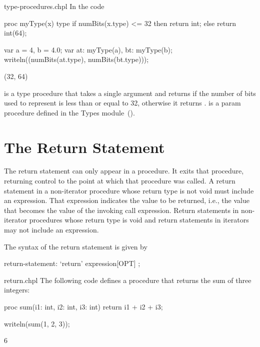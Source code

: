 \begin{chapelexample}{type-procedures.chpl}
In the code
\begin{chapel}
proc myType(x) type {
  if numBits(x.type) <= 32 then return int;
  else return int(64);
}
\end{chapel}
\begin{chapelpost}
var a = 4,
    b = 4.0;
var at: myType(a),
    bt: myType(b);
writeln((numBits(at.type), numBits(bt.type)));
\end{chapelpost}
\begin{chapeloutput}
(32, 64)
\end{chapeloutput}
 is a type procedure that takes a single
argument  and returns  if the number of bits used to
represent  is less than or equal to 32, otherwise it
returns .   is a param
procedure defined in the Types module~().
\end{chapelexample}


\section{The Return Statement}
\label{The_Return_Statement}

The return statement can only appear in a procedure.  It exits that
procedure, returning control to the point at which that procedure was
called.  A return statement in a non-iterator procedure whose
return type is not void must include an expression.
That expression indicates the value to be returned,
i.e., the value that becomes the value of the invoking call expression.
Return statements in non-iterator procedures whose return type is void
and return statements in iterators may not include an expression.

The syntax of the return statement is given by
\begin{syntax}
return-statement:
  `return' expression[OPT] ;
\end{syntax}

\begin{chapelexample}{return.chpl}
The following code defines a procedure that returns the sum of three
integers:
\begin{chapel}
proc sum(i1: int, i2: int, i3: int)
  return i1 + i2 + i3;
\end{chapel}
\begin{chapelpost}
writeln(sum(1, 2, 3));
\end{chapelpost}
\begin{chapeloutput}
6
\end{chapeloutput}
\end{chapelexample}


